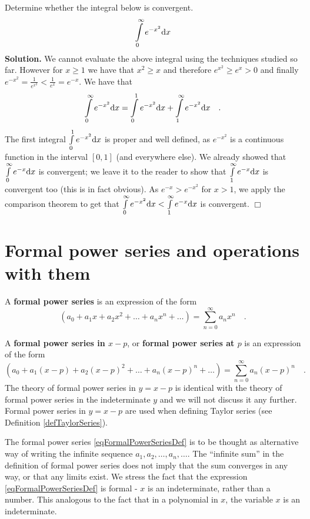 \documentclass[12pt]{book}
\newenvironment{solution}{\medskip\noindent\textbf{Solution.} }{$\Box$}
\renewcommand{\emph}{\textbf}
\begin{document}
Determine whether the integral below is convergent.
\[
\int\limits_{0}^{\infty}e^{-x^2}{\normalfont \text{d}} x
\]
\begin{solution}
We cannot evaluate the above integral using the techniques studied so far. However  for $x\geq 1$ we have that $x^2\geq x$ and therefore $e^{x^2}\geq e^{x}>0$ and finally $e^{-x^2}= \frac{1}{e^{x^2}}<\frac{1}{e^x}= e^{-x}$. We have that
\[
\int\limits_{0}^{\infty}e^{-x^2}{\normalfont \text{d}} x= \int\limits_{0}^{1}e^{-x^2}{\normalfont \text{d}} x +\int\limits_{1}^{\infty}e^{-x^2}{\normalfont \text{d}} x\quad .
\]
The first integral $\int\limits_{0}^{1}e^{-x^2}{\normalfont \text{d}} x$ is proper and well defined, as $e^{-x^2}$ is a continuous function in the interval $[0,1]$ (and everywhere else).  We already showed that $ \int\limits_{0}^{\infty}e^{-x}{\normalfont \text{d}} x$ is convergent; we leave it to the reader to show that $ \int\limits_{1}^{\infty}e^{-x}{\normalfont \text{d}} x$ is convergent too (this is in fact obvious). As $e^{-x}>e^{-x^2}$ for $x>1$, we apply the comparison theorem to get that $\int\limits_{0}^{\infty}e^{-x^2}{\normalfont \text{d}} x<\int\limits_{1}^{\infty}e^{-x}{\normalfont \text{d}} x$ is convergent.
\end{solution}

\section{Formal power series and operations with them} \label{secFormalPowerSeries}
 A \emph{formal power series} is an expression of the form
\begin{equation}\label{eqFormalPowerSeriesDef}
(a_0 + a_1x+a_2x^2+\dots +a_nx^n+\dots)= \sum_{n=0}^{\infty} a_n x^n \quad .
\end{equation}

 A \emph{formal power series in $x-p$}, or \emph{formal power series at $p$} is an expression of the form
\begin{equation}\label{eqFormalPowerAtPSeriesDef}
(a_0 + a_1(x-p)+a_2(x-p)^2+\dots +a_n(x-p)^n+\dots)= \sum_{n=0}^{\infty} a_n (x-p)^n \quad .
\end{equation}
The theory of formal power series in $y=x-p$ is identical with the theory of formal power series in the indeterminate $y$ and we will not discuss it any further. Formal power series in $y=x-p$ are used when defining Taylor series (see Definition \ref{defTaylorSeries}).

The formal power series \eqref{eqFormalPowerSeriesDef} is to be thought as alternative way of writing the infinite sequence $a_1, a_2, \dots, a_n,\dots $. The ``infinite sum'' in the definition of formal power series does not imply that the sum converges in any way, or that any limits exist. We stress the fact that the expression  \eqref{eqFormalPowerSeriesDef} is  formal - $x$  is an indeterminate, rather than a number. This analogous to the fact that in a polynomial in $x$, the variable $x$ is an indeterminate.
\end{document}
